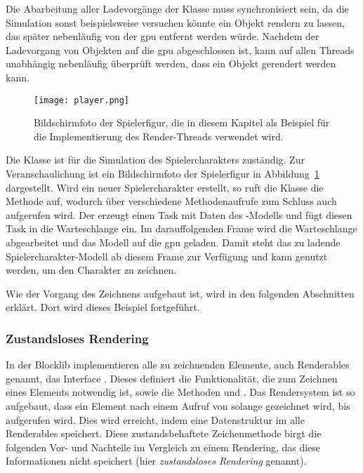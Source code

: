 Die Abarbeitung aller Ladevorgänge der Klasse  muss synchronisiert sein, da die Simulation sonst beispielsweise versuchen könnte ein Objekt rendern zu lassen, das später nebenläufig von der \ac{gpu} entfernt werden würde. Nachdem der Ladevorgang von Objekten auf die \ac{gpu} abgeschlossen ist, kann auf allen Threads unabhängig nebenläufig überprüft werden, dass ein Objekt gerendert werden kann.

\begin{figure}
	\centering
	\texttt{[image: player.png]}
	\caption[Bildschirmfoto der Spielerfigur in der Blocklib.]{Bildschirmfoto der Spielerfigur, die in diesem Kapitel als Beispiel für die Implementierung des Render-Threads verwendet wird.}\label{fig:player}
\end{figure}

\begin{example}
	Die Klasse  ist für die Simulation des Spielercharakters zuständig. Zur Veranschaulichung ist ein Bildschirmfoto der Spielerfigur in Abbildung~\ref{fig:player} dargestellt. Wird ein neuer Spielercharakter erstellt, so ruft die Klasse  die Methode  auf, wodurch über verschiedene Methodenaufrufe zum Schluss auch  aufgerufen wird. Der  erzeugt einen Task mit Daten des -Modells und fügt diesen Task in die Warteschlange ein. Im darauffolgenden Frame wird die Warteschlange abgearbeitet und das Modell auf die \ac{gpu} geladen. Damit steht das zu ladende Spielercharakter-Modell ab diesem Frame zur Verfügung und kann genutzt werden, um den Charakter zu zeichnen. 

	Wie der Vorgang des Zeichnens aufgebaut ist, wird in den folgenden Abschnitten erklärt. Dort wird dieses Beispiel fortgeführt.
\end{example}

\subsubsection{Zustandsloses Rendering}\label{sec:statelessRendering}
In der Blocklib implementieren alle zu zeichnenden Elemente, auch Renderables genannt, das Interface . Dieses definiert die Funktionalität, die zum Zeichnen eines Elements notwendig ist, sowie die Methoden  und . Das Rendersystem ist so aufgebaut, dass ein Element nach einem Aufruf von  solange gezeichnet wird, bis  aufgerufen wird. Dies wird erreicht, indem eine Datenstruktur im  alle Renderables speichert. Diese zustandsbehaftete Zeichenmethode birgt die folgenden Vor- und Nachteile im Vergleich zu einem Rendering, das diese Informationen nicht speichert (hier \emph{zustandsloses Rendering} genannt).

